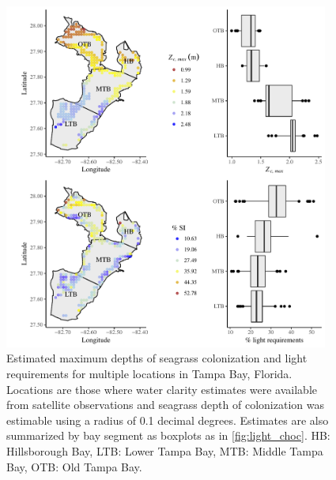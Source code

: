 \documentclass[letterpaper,12pt,oneside]{article}\usepackage[]{graphicx}\usepackage[]{color}
\begin{document}
\begin{figure}
\centering
\includegraphics[width = 0.95\textwidth]{figs/FigS2.pdf}
\caption{Estimated maximum depths of seagrass colonization and light requirements for multiple locations in Tampa Bay, Florida. Locations are those where water clarity estimates were available from satellite observations and seagrass depth of colonization was estimable using a radius of 0.1 decimal degrees.  Estimates are also summarized by bay segment as boxplots as in \cref{fig:light_choc}. HB: Hillsborough Bay, LTB: Lower Tampa Bay, MTB: Middle Tampa Bay, OTB: Old Tampa Bay.}
\label{fig:light_tb_zcmax}
\end{figure}

\end{document}
